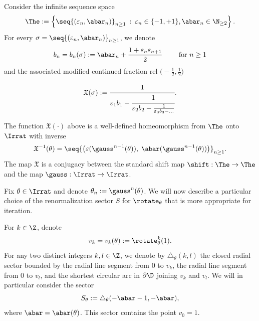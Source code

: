 \documentclass{amsart}
\begin{document}
Consider the infinite sequence space
\[
    \The := \left\{ \seq{ (\varepsilon_n, \abar_n) }_{n\geq 1} \: : \: \varepsilon_n \in \{-1,+1\}, \abar_n \in \N_{\geq 2} \right\}.
\]
For every $\sigma = \seq{(\varepsilon_n, \abar_n )}_{n\geq 1}$, we denote
\begin{equation}
   \label{eq:dfn.b_n}
    b_n = b_n(\sigma) := \abar_n + \frac{1 + \varepsilon_n \varepsilon_{n+1}}{2} \qquad \text{ for } n \geq 1
\end{equation}
and the associated modified continued fraction rel $\Big(-\frac 12, \frac 12\Big)$

\begin{align}
\label{eqn:symbolic-irrational}
    \mathfrak{X}( \sigma ) := \cfrac{1}{\varepsilon_1 b_1 - \cfrac{1}{\varepsilon_2 b_2 - \frac{1}{\varepsilon_3 b_3 - \ldots}}}.
\end{align}

\begin{theorem}\label{thm:X.theta}
    The function $\mathfrak{X}(\cdot)$ above is a well-defined homeomorphism from $\The$ onto $\Irrat$ with inverse
    \[
        \mathfrak{X}^{-1}(\theta) = \seq{ \big( \varepsilon( \gauss^{n-1}(\theta)),\;\abar(\gauss^{n-1}(\theta) ) \big) }_{n\geq 1}.
    \]
    The map $\mathfrak{X}$ is a conjugacy between the standard shift map $\shift: \The \to \The$ and the map $\gauss: \Irrat \to \Irrat$.
\end{theorem}

Fix $\theta \in \Irrat$ and denote $\theta_n := \gauss^n(\theta)$.
We will now describe a particular choice of the renormalization sector $S$ for $\rotate_\theta$ that is more appropriate for iteration.

For $k \in \Z$, denote 
\[
    v_k = v_k(\theta) := \rotate_\theta^k(1).
\]
For any two distinct integers $k,l \in \Z$, we denote by $\triangle_{\theta}(k,l)$ the closed radial sector bounded by the radial line segment from $0$ to $v_k$, the radial line segment from $0$ to $v_l$, and the shortest circular arc in $\partial \D$ joining $v_k$ and $v_l$.
We will in particular consider the sector
\[
    S_\theta := \triangle_{\theta}(-\abar-1,-\abar),
\]
where $\abar=\abar(\theta)$. 
This sector contains the point $v_0 = 1$. 
\end{document}
